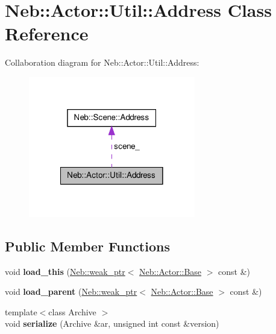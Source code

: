 \hypertarget{classNeb_1_1Actor_1_1Util_1_1Address}{\section{\-Neb\-:\-:\-Actor\-:\-:\-Util\-:\-:\-Address \-Class \-Reference}
\label{classNeb_1_1Actor_1_1Util_1_1Address}
}


\-Collaboration diagram for \-Neb\-:\-:\-Actor\-:\-:\-Util\-:\-:\-Address\-:\nopagebreak
\begin{figure}[H]
\begin{center}
\leavevmode
\includegraphics[width=206pt]{classNeb_1_1Actor_1_1Util_1_1Address__coll__graph}
\end{center}
\end{figure}
\subsection*{\-Public \-Member \-Functions}
\begin{DoxyCompactItemize}
\item 
\hypertarget{classNeb_1_1Actor_1_1Util_1_1Address_a9e4a384cf53294da3e13ba3769f3d4e5}{void {\bfseries load\-\_\-this} (\hyperlink{classNeb_1_1weak__ptr}{\-Neb\-::weak\-\_\-ptr}$<$ \hyperlink{classNeb_1_1Actor_1_1Base}{\-Neb\-::\-Actor\-::\-Base} $>$ const \&)}\label{classNeb_1_1Actor_1_1Util_1_1Address_a9e4a384cf53294da3e13ba3769f3d4e5}

\item 
\hypertarget{classNeb_1_1Actor_1_1Util_1_1Address_af71eb9c9bea039a653f608b7564bda64}{void {\bfseries load\-\_\-parent} (\hyperlink{classNeb_1_1weak__ptr}{\-Neb\-::weak\-\_\-ptr}$<$ \hyperlink{classNeb_1_1Actor_1_1Base}{\-Neb\-::\-Actor\-::\-Base} $>$ const \&)}\label{classNeb_1_1Actor_1_1Util_1_1Address_af71eb9c9bea039a653f608b7564bda64}

\item 
\hypertarget{classNeb_1_1Actor_1_1Util_1_1Address_ad128a12446aadf26c8aee1f0a6df36fc}{{\footnotesize template$<$class Archive $>$ }\\void {\bfseries serialize} (\-Archive \&ar, unsigned int const \&version)}\label{classNeb_1_1Actor_1_1Util_1_1Address_ad128a12446aadf26c8aee1f0a6df36fc}

\end{DoxyCompactItemize}
